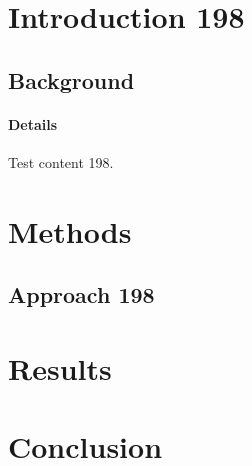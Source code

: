 \documentclass{article}
\begin{document}
\section{Introduction 198}
\subsection{Background}
\paragraph{Details} Test content 198.
\section{Methods}
\subsection{Approach 198}
\section{Results}
\section{Conclusion}
\end{document}
